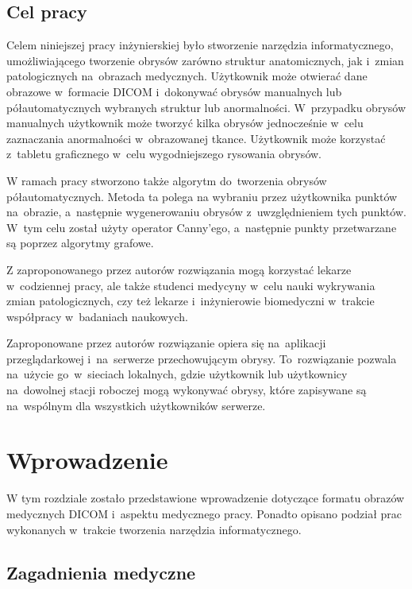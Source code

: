 \documentclass[a4paper,11pt,twoside,openright]{report}
\theoremstyle{definition}
\begin{document}
\section*{Cel pracy}

Celem niniejszej pracy inżynierskiej było stworzenie narzędzia informatycznego,
umożliwiającego tworzenie obrysów zarówno struktur anatomicznych, jak i~zmian patologicznych
na~obrazach medycznych. Użytkownik może otwierać
dane obrazowe w~formacie DICOM i~dokonywać obrysów manualnych lub półautomatycznych
wybranych struktur lub anormalności. W~przypadku obrysów manualnych użytkownik
może tworzyć kilka obrysów jednocześnie w~celu zaznaczania anormalności w~obrazowanej tkance.
Użytkownik może korzystać z~tabletu graficznego w~celu wygodniejszego rysowania obrysów.

W ramach pracy stworzono także algorytm do~tworzenia obrysów półautomatycznych.
Metoda ta polega na wybraniu przez użytkownika punktów na~obrazie, a~następnie
wygenerowaniu obrysów z~uwzględnieniem tych punktów. W~tym celu
został użyty operator Canny'ego, a~następnie punkty przetwarzane są
poprzez algorytmy grafowe.

Z zaproponowanego przez autorów rozwiązania mogą korzystać lekarze w~codziennej pracy, ale także
studenci medycyny w~celu nauki wykrywania zmian patologicznych, czy też lekarze i~inżynierowie
biomedyczni w~trakcie współpracy w~badaniach naukowych.

Zaproponowane przez autorów rozwiązanie opiera się na~aplikacji przeglądarkowej
i~na~serwerze przechowującym obrysy. To~rozwiązanie pozwala na~użycie go~w~sieciach
lokalnych, gdzie użytkownik lub użytkownicy na~dowolnej stacji roboczej mogą
wykonywać obrysy, które zapisywane są na~wspólnym dla wszystkich użytkowników serwerze.


\chapter {Wprowadzenie}

W tym rozdziale zostało przedstawione wprowadzenie dotyczące formatu obrazów
medycznych DICOM i~aspektu medycznego pracy.
Ponadto opisano podział prac wykonanych w~trakcie tworzenia
narzędzia informatycznego.

\section {Zagadnienia medyczne}
\end{document}
